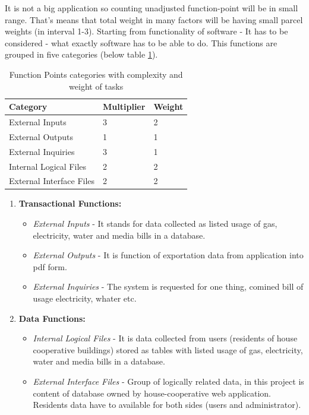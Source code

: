 \documentclass[a4paper,10pt]{report}
\begin{document}
It is not a big application so counting unadjusted function-point will be in small range. That's means that total weight in many factors will be having small parcel weights (in interval 1-3). Starting from functionality of software - It has to be considered - what exactly software has to be able to do. This functions are grouped in five categories (below table \ref{tab111}).

\begin{table}[H]
	\centering
\begin{tabular}{|l|l|l|}
\hline
\rowcolor{pink!80!}\textbf{Category}& \textbf{Multiplier} & \textbf{Weight} \\ \hline
External Inputs          & 3          & 2      \\ \hline
External Outputs         & 1          & 1      \\ \hline
External Inquiries       & 3          & 1      \\ \hline
Internal Logical Files   & 2          & 2      \\ \hline
External Interface Files & 2          & 2      \\ \hline
\end{tabular}
\caption{Function Points categories with complexity and weight of tasks}
 \label{tab111}
\end{table}

  \begin{enumerate}

 \item\textbf{Transactional Functions:}
   \begin{itemize} 
  \item \textit{External Inputs} - It stands for data collected as listed usage of gas, electricity, water and media bills in a database.
  \item \textit{External Outputs} - It is function of exportation data from application into pdf form.
  \item \textit{External Inquiries} - The system is requested for one thing, comined bill of usage electricity, whater etc.
  \end{itemize}
  
\item\textbf{Data Functions:}
  \begin{itemize}
  \item \textit{Internal Logical Files} - It is data collected from users (residents of house cooperative buildings) stored as tables with listed usage of gas, electricity, water and media bills in a database.
  \item \textit{External Interface Files} - Group of logically related data, in this project is content of database owned by house-cooperative web application. Residents data have to available for both sides (users and administrator).
  \end{itemize}  
 
  \end{enumerate}
\end{document}
